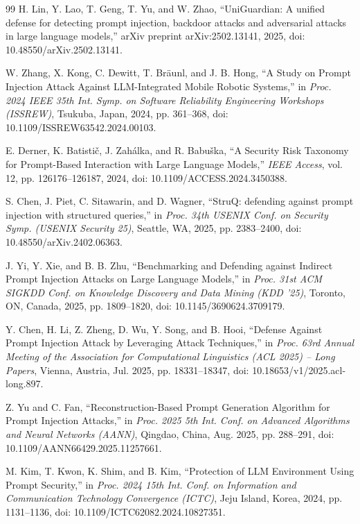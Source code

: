 \documentclass[12pt, letterpaper]{article}   %
\begin{document}
\begin{thebibliography}{99}
H. Lin, Y. Lao, T. Geng, T. Yu, and W. Zhao, ``UniGuardian: A unified defense for detecting prompt injection, backdoor attacks and adversarial attacks in large language models,'' arXiv preprint arXiv:2502.13141, 2025, doi: 10.48550/arXiv.2502.13141.

W. Zhang, X. Kong, C. Dewitt, T. Br\"{a}unl, and J. B. Hong, ``A Study on Prompt Injection Attack Against LLM-Integrated Mobile Robotic Systems,'' in \textit{Proc. 2024 IEEE 35th Int. Symp. on Software Reliability Engineering Workshops (ISSREW)}, Tsukuba, Japan, 2024, pp. 361--368, doi: 10.1109/ISSREW63542.2024.00103.

E. Derner, K. Batisti\v{c}, J. Zah\'{a}lka, and R. Babu\v{s}ka, ``A Security Risk Taxonomy for Prompt-Based Interaction with Large Language Models,'' \textit{IEEE Access}, vol. 12, pp. 126176--126187, 2024, doi: 10.1109/ACCESS.2024.3450388.

S. Chen, J. Piet, C. Sitawarin, and D. Wagner, ``StruQ: defending against prompt injection with structured queries,'' in \textit{Proc. 34th USENIX Conf. on Security Symp. (USENIX Security 25)}, Seattle, WA, 2025, pp. 2383--2400, doi: 10.48550/arXiv.2402.06363.

J. Yi, Y. Xie, and B. B. Zhu, ``Benchmarking and Defending against Indirect Prompt Injection Attacks on Large Language Models,'' in \textit{Proc. 31st ACM SIGKDD Conf. on Knowledge Discovery and Data Mining (KDD '25)}, Toronto, ON, Canada, 2025, pp. 1809--1820, doi: 10.1145/3690624.3709179.

Y. Chen, H. Li, Z. Zheng, D. Wu, Y. Song, and B. Hooi, ``Defense Against Prompt Injection Attack by Leveraging Attack Techniques,'' in \textit{Proc. 63rd Annual Meeting of the Association for Computational Linguistics (ACL 2025) -- Long Papers}, Vienna, Austria, Jul. 2025, pp. 18331--18347, doi: 10.18653/v1/2025.acl-long.897.

Z. Yu and C. Fan, ``Reconstruction-Based Prompt Generation Algorithm for Prompt Injection Attacks,'' in \textit{Proc. 2025 5th Int. Conf. on Advanced Algorithms and Neural Networks (AANN)}, Qingdao, China, Aug. 2025, pp. 288--291, doi: 10.1109/AANN66429.2025.11257661.

M. Kim, T. Kwon, K. Shim, and B. Kim, ``Protection of LLM Environment Using Prompt Security,'' in \textit{Proc. 2024 15th Int. Conf. on Information and Communication Technology Convergence (ICTC)}, Jeju Island, Korea, 2024, pp. 1131--1136, doi: 10.1109/ICTC62082.2024.10827351.


\end{thebibliography}
\end{document}
